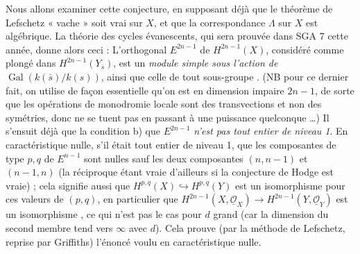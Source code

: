 \documentclass[11pt,a4paper]{article}
\begin{document}
Nous allons examiner cette conjecture, en supposant déjà que le théorème de
Lefschetz « vache » soit vrai sur $X$, et que la correspondance $\Lambda$ sur $X$
est algébrique. La théorie des cycles évanescents, qui sera prouvée dans SGA 7
cette année, donne alors ceci : L'orthogonal $E^{2n-1}$ de $H^{2n-1}(X)$, considéré
comme plongé dans $H^{2n-1}(Y_{\bar s})$, est un \emph{module simple sous l'action
de} $\operatorname{Gal}(k(\bar s)/k(s))$, ainsi que  celle de tout
sous-groupe  . (NB pour ce dernier fait,
on utilise de façon essentielle qu'on est en dimension impaire $2n-1$, de sorte que
les opérations de monodromie locale sont des transvections et non des symétries,
donc ne se tuent pas en passant à une puissance quelconque \ldots) Il s'ensuit déjà
que la condition b)  que $E^{2n-1}$ \emph{n'est pas tout
entier de niveau 1}. En caractéristique nulle, s'il était tout entier de niveau 1,
 que les composantes de type $p,q$ de $E^{n-1}$ sont nulles
sauf les deux composantes $(n,n-1)$ et $(n-1,n)$ (la réciproque étant vraie
d'ailleurs si la conjecture de Hodge est vraie) ; cela signifie aussi que
$H^{p,q}(X) \hookrightarrow H^{p,q}(Y)$ est un isomorphisme pour ces valeurs de
$(p,q)$, en particulier que $H^{2n-1}(X, \underline{\mathcal{O}}_X) \to
H^{2n-1}(Y, \underline{\mathcal{O}}_Y)$ est un isomorphisme , ce qui n'est pas le cas pour $d$ grand (car la dimension du second
membre tend vers $\infty$ avec $d$). Cela prouve (par la méthode de Lefschetz,
reprise par Griffiths) l'énoncé voulu en caractéristique nulle.


\end{document}
